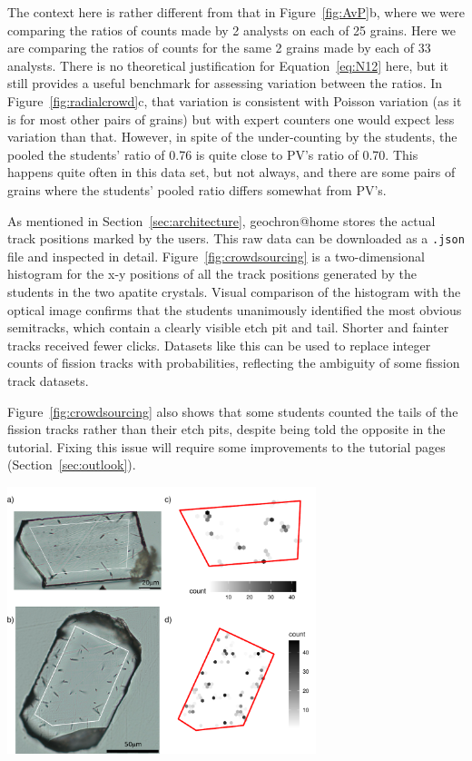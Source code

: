\documentclass[gchron, manuscript]{copernicus}
\begin{document}
The context here is rather different from that in
Figure~\ref{fig:AvP}b, where we were comparing the ratios of counts
made by 2 analysts on each of 25 grains. Here we are comparing the
ratios of counts for the same 2 grains made by each of 33
analysts. There is no theoretical justification for
Equation~\ref{eq:N12} here, but it still provides a useful benchmark
for assessing variation between the ratios. In
Figure~\ref{fig:radialcrowd}c, that variation is consistent with
Poisson variation (as it is for most other pairs of grains) but with
expert counters one would expect less variation than that. However, in
spite of the under-counting by the students, the pooled the students'
ratio of 0.76 is quite close to PV's ratio of 0.70. This happens quite
often in this data set, but not always, and there are some pairs of
grains where the students' pooled ratio differs somewhat from
PV's.\medskip

As mentioned in Section~\ref{sec:architecture}, geochron@home stores
the actual track positions marked by the users. This raw data can be
downloaded as a \texttt{.json} file and inspected in detail.
Figure~\ref{fig:crowdsourcing} is a two-dimensional histogram for the
x-y positions of all the track positions generated by the students in
the two apatite crystals. Visual comparison of the histogram with the
optical image confirms that the students unanimously identified the
most obvious semitracks, which contain a clearly visible etch pit and
tail. Shorter and fainter tracks received fewer clicks. Datasets like
this can be used to replace integer counts of fission tracks with
probabilities, reflecting the ambiguity of some fission track
datasets.\medskip

Figure~\ref{fig:crowdsourcing} also shows that some students counted
the tails of the fission tracks rather than their etch pits, despite
being told the opposite in the tutorial. Fixing this issue will
require some improvements to the tutorial pages
(Section~\ref{sec:outlook}).\medskip

{  \centering
  \includegraphics[width=9cm]{4649vs4673.pdf}
  \label{fig:crowdsourcing}
}%
\end{document}
